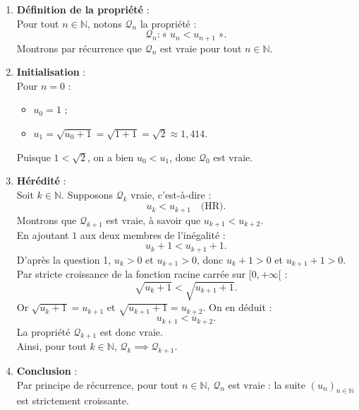 \documentclass[11pt,a4paper]{article}
\newcommand{\N}{\mathbb{N}}
\begin{document}
\begin{correctionbox}
\begin{enumerate}[label=\textbf{\arabic*.}]
    \item \textbf{Définition de la propriété} :\\
    Pour tout $n \in \N$, notons $\mathcal{Q}_n$ la propriété :
    \[
    \mathcal{Q}_n : « \; u_n < u_{n+1} \; ».
    \]
    Montrons par récurrence que $\mathcal{Q}_n$ est vraie pour tout $n \in \N$.

    \item \textbf{Initialisation} :\\
    Pour $n = 0$ :
    \begin{itemize}
        \item $u_0 = 1$ ;
        \item $u_1 = \sqrt{u_0 + 1} = \sqrt{1 + 1} = \sqrt{2} \approx 1{,}414$.
    \end{itemize}
    Puisque $1 < \sqrt{2}$, on a bien $u_0 < u_1$, donc $\mathcal{Q}_0$ est vraie.

    \item \textbf{Hérédité} :\\
    Soit $k \in \N$. Supposons $\mathcal{Q}_k$ vraie, c'est-à-dire :
    \[
    u_k < u_{k+1} \quad \text{(HR)}.
    \]
    Montrons que $\mathcal{Q}_{k+1}$ est vraie, à savoir que $u_{k+1} < u_{k+2}$.\\
    En ajoutant $1$ aux deux membres de l'inégalité :
    \[
    u_k + 1 < u_{k+1} + 1.
    \]
    D'après la question 1, $u_k > 0$ et $u_{k+1} > 0$, donc $u_k + 1 > 0$ et $u_{k+1} + 1 > 0$.\\
    Par stricte croissance de la fonction racine carrée sur $[0, +\infty[$ :
    \[
    \sqrt{u_k + 1} < \sqrt{u_{k+1} + 1}.
    \]
    Or $\sqrt{u_k + 1} = u_{k+1}$ et $\sqrt{u_{k+1} + 1} = u_{k+2}$. On en déduit :
    \[
    u_{k+1} < u_{k+2}.
    \]
    La propriété $\mathcal{Q}_{k+1}$ est donc vraie.\\
    Ainsi, pour tout $k \in \N$, $\mathcal{Q}_k \implies \mathcal{Q}_{k+1}$.

    \item \textbf{Conclusion} :\\
    Par principe de récurrence, pour tout $n \in \N$, $\mathcal{Q}_n$ est vraie : la suite $(u_n)_{n \in \N}$ est strictement croissante.
\end{enumerate}
\end{correctionbox}
\end{document}
